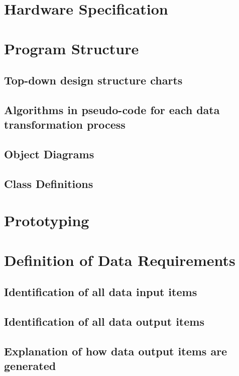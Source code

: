\section{Hardware Specification}

\section{Program Structure}

\subsection{Top-down design structure charts}

\subsection{Algorithms in pseudo-code for each data transformation process}

\subsection{Object Diagrams}

\subsection{Class Definitions}

\section{Prototyping}

\section{Definition of Data Requirements}

\subsection{Identification of all data input items}

\subsection{Identification of all data output items}

\subsection{Explanation of how data output items are generated}

